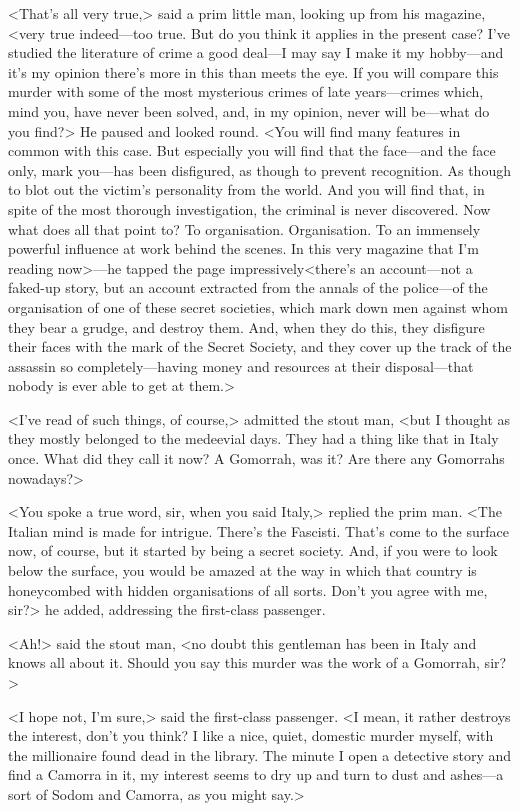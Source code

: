 <That's all very true,> said a prim little man, looking up from his magazine, <very true indeed—too true. But do you think it applies in the present case? I've studied the literature of crime a good deal—I may say I make it my hobby—and it's my opinion there's more in this than meets the eye. If you will compare this murder with some of the most mysterious crimes of late years—crimes which, mind you, have never been solved, and, in my opinion, never will be—what do you find?> He paused and looked round. <You will find many features in common with this case. But especially you will find that the face—and the face only, mark you—has been disfigured, as though to prevent recognition. As though to blot out the victim's personality from the world. And you will find that, in spite of the most thorough investigation, the criminal is never discovered. Now what does all that point to? To organisation. Organisation. To an immensely powerful influence at work behind the scenes. In this very magazine that I'm reading now>—he tapped the page impressively\longdash<there's an account—not a faked-up story, but an account extracted from the annals of the police—of the organisation of one of these secret societies, which mark down men against whom they bear a grudge, and destroy them. And, when they do this, they disfigure their faces with the mark of the Secret Society, and they cover up the track of the assassin so completely—having money and resources at their disposal—that nobody is ever able to get at them.>

<I've read of such things, of course,> admitted the stout man, <but I thought as they mostly belonged to the medeevial days. They had a thing like that in Italy once. What did they call it now? A Gomorrah, was it? Are there any Gomorrahs nowadays?>

<You spoke a true word, sir, when you said Italy,> replied the prim man. <The Italian mind is made for intrigue. There's the Fascisti. That's come to the surface now, of course, but it started by being a secret society. And, if you were to look below the surface, you would be amazed at the way in which that country is honeycombed with hidden organisations of all sorts. Don't you agree with me, sir?> he added, addressing the first-class passenger.

<Ah!> said the stout man, <no doubt this gentleman has been in Italy and knows all about it. Should you say this murder was the work of a Gomorrah, sir?>

<I hope not, I'm sure,> said the first-class passenger. <I mean, it rather destroys the interest, don't you think? I like a nice, quiet, domestic murder myself, with the millionaire found dead in the library. The minute I open a detective story and find a Camorra in it, my interest seems to dry up and turn to dust and ashes—a sort of Sodom and Camorra, as you might say.>

